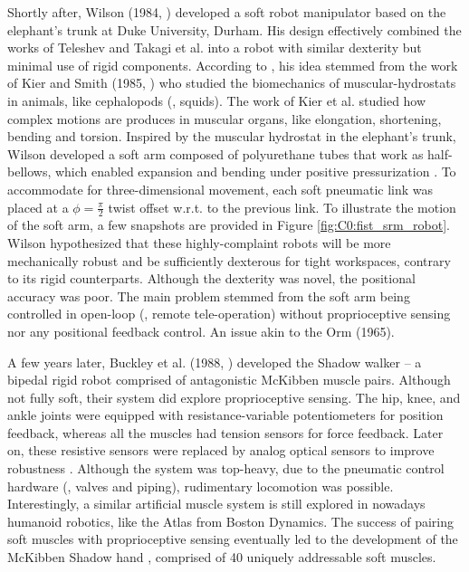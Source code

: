 %
\par Shortly after, Wilson (1984, \cite{Wilson2007}) developed a soft robot manipulator based on the elephant's trunk at Duke University, Durham. His design effectively combined the works of Teleshev \cite{Teleshev1981} and Takagi et al. \cite{Takagi1983} into a robot with similar dexterity but minimal use of rigid components. According to \cite{Weisburd1988}, his idea stemmed from the work of Kier and Smith (1985, \cite{Kier1985}) who studied the biomechanics of muscular-hydrostats in animals, like cephalopods (\eg, squids). The work of Kier et al. \cite{Kier1985} studied how complex motions are produces in muscular organs, like elongation, shortening, bending and torsion. Inspired by the muscular hydrostat in the elephant's trunk, Wilson developed a soft arm composed of polyurethane tubes that work as half-bellows, which enabled expansion and bending under positive pressurization \cite{Weisburd1988}. To accommodate for three-dimensional movement, each soft pneumatic link was placed at a $ \phi = \frac{\pi}{2}$ twist offset w.r.t. to the previous link. To illustrate the motion of the soft arm, a few snapshots are provided in Figure \ref{fig:C0:fist_srm_robot}. Wilson hypothesized that these highly-complaint robots will be more mechanically robust and be sufficiently dexterous for tight workspaces, contrary to its rigid counterparts. Although the dexterity was novel, the positional accuracy was poor. The main problem stemmed from the soft arm being controlled in open-loop (\ie, remote tele-operation) without proprioceptive sensing nor any positional feedback control. An issue akin to the Orm (1965). 

A few years later, Buckley et al. (1988, \cite{Buckley2012}) developed the Shadow walker -- a bipedal rigid robot comprised of antagonistic McKibben muscle pairs. Although not fully soft, their system did explore proprioceptive sensing. The hip, knee, and ankle joints were equipped with resistance-variable potentiometers for position feedback, whereas all the muscles had tension sensors for force feedback. Later on, these resistive sensors were replaced by analog optical sensors to improve robustness \cite{Buckley2012}. Although the system was top-heavy, due to the pneumatic control hardware (\eg, valves and piping), rudimentary locomotion was possible. Interestingly, a similar artificial muscle system is still explored in nowadays humanoid robotics, like the Atlas from Boston Dynamics. The success of pairing soft muscles with proprioceptive sensing eventually led to the development of the McKibben Shadow hand \cite{Buckley2012,Gong2022Feb}, comprised of 40 uniquely addressable soft muscles. 

